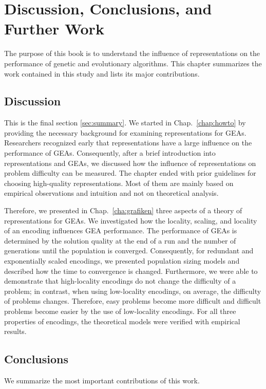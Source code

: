 \chapter{Discussion, Conclusions, and Further Work}
\label{chap:conclusions}
The purpose of this book is to understand  the influence of representations on the performance of genetic and evolutionary algorithms. 
This chapter summarizes the work contained in this study and lists its major contributions.


\section{Discussion}
\label{sec:discussion}

This is the final section \ref{sec:summary}. We  started in Chap.~\ref{chap:howto} by providing the necessary background for examining representations for  GEAs. Researchers recognized early that representations have a large influence on the performance of GEAs. Consequently, after a brief introduction into representations and GEAs, we discussed how the influence of representations on problem difficulty  can be measured. The chapter ended with prior guidelines for choosing high-quality  representations. Most of them are  mainly based on empirical observations and intuition and not on theoretical analysis.

Therefore, we presented in Chap.~\ref{cha:grafiken} three aspects of a theory of representations for  GEAs. We investigated how the locality, scaling, and locality of an encoding  influences GEA performance. The performance of GEAs is determined by the solution quality at the end of a run and the number of generations until the population is converged. Consequently, for redundant and exponentially scaled encodings, we presented population sizing models and described how the time to convergence is changed.
Furthermore, we were able to demonstrate that high-locality encodings do not change the difficulty of a problem; in contrast, when using low-locality encodings, on average, the difficulty of problems changes. Therefore,  easy problems become more difficult and difficult problems become easier by the use of low-locality encodings.
For all three properties of encodings, the theoretical models were verified with empirical results.


\section{Conclusions}
We  summarize the most important contributions of this work.

